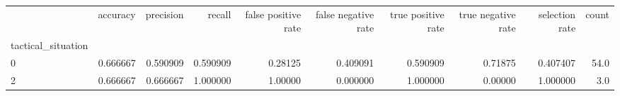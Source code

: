 \begin{tabular}{lrrrrrrrrr}
\toprule
{} &  accuracy &  precision &    recall &  false positive rate &  false negative rate &  true positive rate &  true negative rate &  selection rate &  count \\
tactical\_situation &           &            &           &                      &                      &                     &                     &                 &        \\
\midrule
0                  &  0.666667 &   0.590909 &  0.590909 &              0.28125 &             0.409091 &            0.590909 &             0.71875 &        0.407407 &   54.0 \\
2                  &  0.666667 &   0.666667 &  1.000000 &              1.00000 &             0.000000 &            1.000000 &             0.00000 &        1.000000 &    3.0 \\
\bottomrule
\end{tabular}
